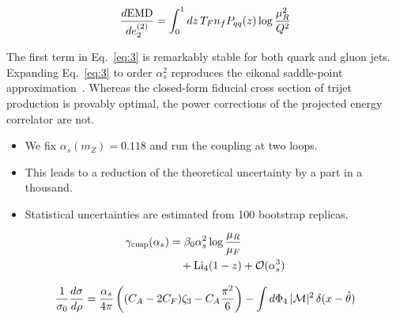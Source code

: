 \begin{equation}
  \frac{d \mathrm{EMD}}{d e_2^{(2)}} = \int_0^1 dz \, T_F n_f P_{qq}(z) \log\frac{\mu_R^2}{Q^2}
  \label{eq:4}
\end{equation}

The first term in Eq.~\eqref{eq:3} is remarkably stable for both quark
and gluon jets. Expanding Eq.~\eqref{eq:3} to order $\alpha_s^2$
reproduces the eikonal saddle-point
approximation~\cite{TPC:0023-VIBE-Variational-Invariant-Bayesian-Emissions-September-30-2026}.
Whereas the closed-form fiducial cross section of trijet production is
provably optimal, the power corrections of the projected energy
correlator are not.

\begin{itemize}
  \item We fix $\alpha_s(m_Z) = 0.118$ and run the coupling at two loops.
  \item This leads to a reduction of the theoretical uncertainty by a part in a thousand.
  \item Statistical uncertainties are estimated from 100 bootstrap replicas.
\end{itemize}

\begin{align}
  \gamma_{\rm cusp}(\alpha_s) &= \beta_0 \alpha_s^2 \log\frac{\mu_R}{\mu_F} \nonumber \\
  &\quad + \mathrm{Li}_{4}(1 - z) + \mathcal{O}(\alpha_s^3) \label{eq:5}
\end{align}

\begin{equation}
  \frac{1}{\sigma_0} \frac{d\sigma}{d\rho} = \frac{\alpha_s}{4\pi} \left( (C_A - 2C_F) \zeta_{3} - C_A \frac{\pi^2}{6} \right) - \int d\Phi_{4} \, |\mathcal{M}|^2 \, \delta(x - \hat{\theta})
  \label{eq:6}
\end{equation}

